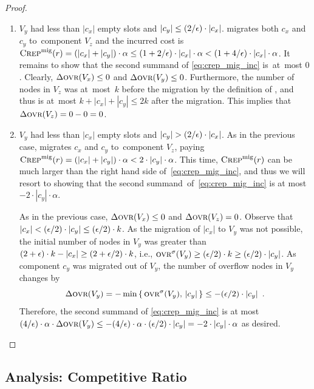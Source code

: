 \begin{proof}
\begin{enumerate}
\item 
$V_y$ had less than $|c_x|$ empty slots and $|c_y| \leq (2/\epsilon) \cdot |c_x|$.
\CREP migrates both $c_x$ and $c_y$ to~component $V_z$ and the incurred cost is 
$\textsc{Crep}^\textnormal{mig}(r) = (|c_x| + |c_y|) \cdot \alpha \leq (1+2/\epsilon) \cdot |c_x| \cdot \alpha
< (1 + 4/\epsilon) \cdot |c_x| \cdot \alpha$. 
It remains to show that the second summand of \eqref{eq:crep_mig_inc} is~at~most $0$. 
Clearly, $\Delta \textsc{ovr}(V_x) \leq 0$ and $\Delta \textsc{ovr}(V_y) \leq 0$. 
Furthermore, the number of 
nodes in $V_z$ was at~most~$k$ before the migration by the definition of \CREP,
and thus is at~most $k + |c_x| + |c_y| \leq 2k$ after the migration.
This implies that $\Delta \textsc{ovr}(V_z) = 0 - 0 = 0$.

\item 
$V_y$ had less than $|c_x|$ empty slots and $|c_y| > (2/\epsilon) \cdot |c_x|$.
As in the previous case, \CREP migrates $c_x$ and $c_y$ to~component $V_z$, 
paying $\textsc{Crep}^\textnormal{mig}(r) = (|c_x| + |c_y|) \cdot \alpha < 2 \cdot |c_y| \cdot \alpha$.
This time, $\textsc{Crep}^\textnormal{mig}(r)$ can be much larger than the right hand side 
of~\eqref{eq:crep_mig_inc}, and thus we will resort to showing that the second summand~of~\eqref{eq:crep_mig_inc} is at most $ - 2 \cdot |c_y| \cdot \alpha$.

As in the previous case, $\Delta \textsc{ovr}(V_x) \leq 0$ and $\Delta \textsc{ovr}(V_z) = 0$. 
Observe that $|c_x| < (\epsilon / 2) \cdot |c_y| \leq (\epsilon / 2) \cdot k$.
As the migration of $|c_x|$ to $V_y$ was not possible, the initial number
of nodes in $V_y$ was greater than $(2 + \epsilon) \cdot k - |c_x| \geq (2+\epsilon/2) \cdot k$,
i.e., $\textsc{ovr}^\sigma(V_y) \geq (\epsilon/2) \cdot k \geq (\epsilon/2) \cdot |c_y|$. 
As component $c_y$ was migrated out of $V_y$, the number of overflow nodes in $V_y$ changes by
\[
	\Delta \textsc{ovr}(V_y) 
		= - \min \left\{ \,\textsc{ovr}^\sigma(V_y), \,|c_y| \,\right\}
		\leq - (\epsilon/2) \cdot |c_y|
	\enspace.
\]
Therefore, the second summand of \eqref{eq:crep_mig_inc} is at most 
$(4/\epsilon) \cdot \alpha \cdot \Delta\textsc{ovr}(V_y) \leq - (4/\epsilon) \cdot \alpha \cdot (\epsilon/2) \cdot |c_y|
= - 2 \cdot |c_y| \cdot \alpha$ as desired.
\end{enumerate}
\end{proof}


\subsection{Analysis: Competitive Ratio}

